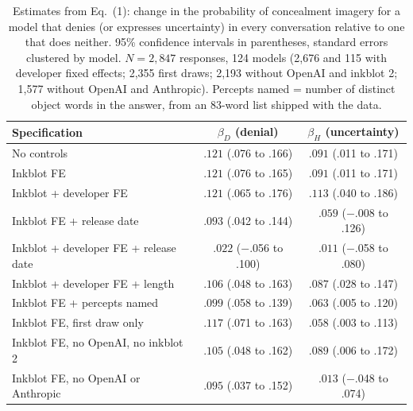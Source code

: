 \documentclass[10pt,twocolumn]{article}
\begin{document}
\begin{table}[t]
\centering\scriptsize\setlength{\tabcolsep}{3pt}
\begin{tabular}{lcc}
\toprule
Specification & $\beta_D$ (denial) & $\beta_H$ (uncertainty) \\
\midrule
No controls               & $.121$ (.076 to .166) & $.091$ (.011 to .171) \\
Inkblot FE                & $.121$ (.076 to .165) & $.091$ (.011 to .171) \\
Inkblot + developer FE    & $.121$ (.065 to .176) & $.113$ (.040 to .186) \\
Inkblot FE + release date & $.093$ (.042 to .144) & $.059$ ($-$.008 to .126) \\
Inkblot + developer FE + release date & $.022$ ($-$.056 to .100) & $.011$ ($-$.058 to .080) \\
Inkblot + developer FE + length & $.106$ (.048 to .163) & $.087$ (.028 to .147) \\
Inkblot FE + percepts named & $.099$ (.058 to .139) & $.063$ (.005 to .120) \\
Inkblot FE, first draw only & $.117$ (.071 to .163) & $.058$ (.003 to .113) \\
Inkblot FE, no OpenAI, no inkblot 2 & $.105$ (.048 to .162) & $.089$ (.006 to .172) \\
Inkblot FE, no OpenAI or Anthropic & $.095$ (.037 to .152) & $.013$ ($-$.048 to .074) \\
\bottomrule
\end{tabular}
\caption{Estimates from Eq.~(1): change in the probability of concealment imagery for a model that
denies (or expresses uncertainty) in every conversation relative to one that does neither. 95\% confidence intervals in parentheses,
standard errors clustered by model. $N = 2{,}847$ responses, 124 models (2,676 and 115 with
developer fixed effects; 2,355 first draws; 2,193 without OpenAI and inkblot 2; 1,577 without
OpenAI and Anthropic). Percepts named = number of distinct object words in the answer, from an
83-word list shipped with the data.}
\label{tab:main}
\end{table}
\end{document}
